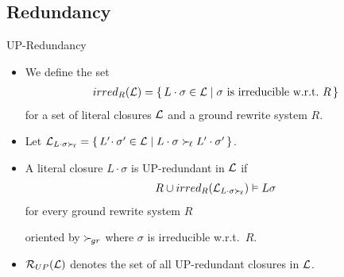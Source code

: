 \documentclass[%
handout,
]{beamer}
\begin{document}
\subsection{Redundancy}
\begin{frame}{UP-Redundancy}
    \begin{itemize}
        \item
    We define the set
    \begin{gather*}
        irred_R(\mathcal{L}) =
        \{\,
        L\cdot\sigma\in\mathcal{L} \mid
        \sigma\text{ is irreducible w.r.t.~}R
        \,\}
    \end{gather*}
    for a set of literal closures $\mathcal{L}$
    and a ground rewrite system $R$.
    
    \vspace{0.7em}
    \item Let 
    $
    \mathcal{L}_{L\cdot\sigma\mathrel\succ_{\!\ell}} =
    \{\,
    L'\!\cdot\sigma'\in\mathcal{L} \mid
    L\cdot\sigma\mathrel\succ_{\!\ell} L'\cdot\sigma'
    \,\}
    $.

    \vspace{0.7em}
    \item A literal closure $L\cdot\sigma$ is UP-redundant in $\mathcal{L}$ if
    \begin{gather*}
        R \cup irred_R(\mathcal{L}_{L\cdot\sigma\mathrel\succ_{\!\ell}}) \vDash L\sigma
    \end{gather*}
    for every ground rewrite system $R$

    oriented by $\mathrel\succ_{\!gr}$
    where $\sigma$ is irreducible w.r.t.~$R$.

    \vspace{0.7em}
    \item
    $\mathcal{R}_{UP}(\mathcal{L})$ denotes the set of all UP-redundant closures in $\mathcal{L}$.
\end{itemize}
\end{frame}
\end{document}
